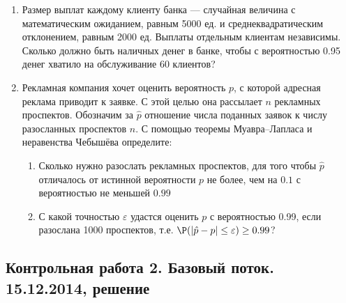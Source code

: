 \begin{enumerate}
\item Размер выплат каждому клиенту банка — случайная величина с математическим
ожиданием, равным 5000 ед. и среднеквадратическим отклонением, равным 2000 ед.
Выплаты отдельным клиентам независимы. Сколько должно быть наличных денег в банке,
чтобы с вероятностью 0.95 денег хватило на обслуживание 60 клиентов?

\item Рекламная компания хочет оценить вероятность $p$, с которой адресная реклама приводит к
заявке. С этой целью она  рассылает $n$ рекламных проспектов. Обозначим за $\hat p$ отношение
числа поданных заявок к числу разосланных проспектов $n$. С помощью теоремы Муавра–Лапласа и неравенства Чебышёва определите:
\begin{enumerate}
\item  Сколько нужно разослать рекламных проспектов, для того чтобы $\hat p$ отличалось от
истинной вероятности $p$ не более, чем на $0.1$ с вероятностью не меньшей $0.99$
\item С какой точностью $\varepsilon$ удастся оценить $p$ с вероятностью 0.99, если разослана 1000
проспектов, т.е. $\P(|\hat p - p|\leq \varepsilon)\geq 0.99$?
\end{enumerate}
\end{enumerate}





\subsection{Контрольная работа 2. Базовый поток. 15.12.2014, решение}


